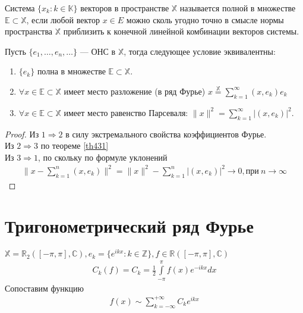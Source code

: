 \begin{definition}
  Система $\{x_k: k \in \mathbb{K} \}$ векторов в пространстве $\mathbb{X}$
  называется полной в множестве $\mathbb{E} \subset \mathbb{X}$, если любой
  вектор $x \in E$ можно сколь угодно точно в смысле нормы пространства
  $\mathbb{X}$ приблизить к конечной линейной комбинации векторов системы.
\end{definition}

\begin{theorem}
  \label{th432}
  Пусть $\{e_1, \dots, e_n, \dots\}$ --- ОНС в $\mathbb{X}$, тогда следующее
  условие эквивалентны:
  \begin{enumerate}
    \item $\{e_k\}$ полна в множестве $\mathbb{E} \subset \mathbb{X}$.
    \item $\forall x \in \mathbb{E} \subset \mathbb{X}$ имеет место разложение
      (в ряд Фурье) $x \overset{\mathbb{X}} = \sum\limits_{k = 1}^{\infty} (x,
      e_k) e_k$
    \item $\forall x \in \mathbb{E} \subset \mathbb{X}$ имеет место равенство
      Парсеваля: $\|x\|^2 = \sum\limits_{k = 1}^{\infty} |(x, e_k)|^2$.
  \end{enumerate}
\end{theorem}

\begin{proof}
  Из $1 \Rightarrow 2$ в силу экстремального свойства коэффициентов Фурье. \\
  Из $2 \Rightarrow 3$ по теореме \eqref{th431} \\
  Из $3 \Rightarrow 1$, по скольку по формуле уклонений
  \begin{gather*}
    \|x - \sum\limits_{k = 1}^{n} (x, e_k)\|^2 = \|x\|^2 - \sum\limits_{k =
    1}^{n} |(x, e_k)|^2 \to 0, \text{при} \ n \to \infty
  \end{gather*}
\end{proof}

\section{Тригонометрический ряд Фурье}
$\mathbb{X} = \mathbb{R}_2([-\pi, \pi], \mathbb{C}), e_k = \{e^{ikx} : k \in
\mathbb{Z}\}, f \in \mathbb{R}([-\pi, \pi], \mathbb{C})$
\begin{gather}
  C_k(f) = C_k = \frac{1}{2} \int\limits_{-\pi}^\pi f(x) e^{-ikx} dx
  \label{ch44:eq1}
\end{gather}
Сопоставим функцию
\begin{gather}
  f(x) \sim \sum\limits_{k = -\infty}^{+\infty} C_k e^{ikx}
  \label{ch44:eq2}
\end{gather}

